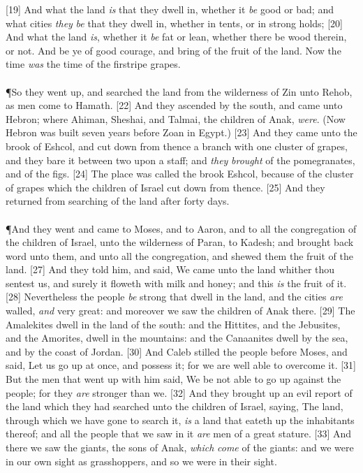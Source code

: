 [19] \textcolor[cmyk]{0.99998,1,0,0}{And what the land \emph{is} that they dwell in, whether it \emph{be} good or bad; and what cities \emph{they} \emph{be} that they dwell in, whether in tents, or in strong holds;}
[20] \textcolor[cmyk]{0.99998,1,0,0}{And what the land \emph{is}, whether it \emph{be} fat or lean, whether there be wood therein, or not. And be ye of good courage, and bring of the fruit of the land. Now the time \emph{was} the time of the firstripe grapes.}\\
\\
\P \textcolor[cmyk]{0.99998,1,0,0}{So they went up, and searched the land from the wilderness of Zin unto Rehob, as men come to Hamath.}
[22] \textcolor[cmyk]{0.99998,1,0,0}{And they ascended by the south, and came unto Hebron; where Ahiman, Sheshai, and Talmai, the children of Anak, \emph{were}. (Now Hebron was built seven years before Zoan in Egypt.)}
[23] \textcolor[cmyk]{0.99998,1,0,0}{And they came unto the brook of Eshcol, and cut down from thence a branch with one cluster of grapes, and they bare it between two upon a staff; and \emph{they} \emph{brought} of the pomegranates, and of the figs.}
[24] \textcolor[cmyk]{0.99998,1,0,0}{The place was called the brook Eshcol, because of the cluster of grapes which the children of Israel cut down from thence.}
[25] \textcolor[cmyk]{0.99998,1,0,0}{And they returned from searching of the land after forty days.}\\
\\
\P \textcolor[cmyk]{0.99998,1,0,0}{And they went and came to Moses, and to Aaron, and to all the congregation of the children of Israel, unto the wilderness of Paran, to Kadesh; and brought back word unto them, and unto all the congregation, and shewed them the fruit of the land.}
[27] \textcolor[cmyk]{0.99998,1,0,0}{And they told him, and said, We came unto the land whither thou sentest us, and surely it floweth with milk and honey; and this \emph{is} the fruit of it.}
[28] \textcolor[cmyk]{0.99998,1,0,0}{Nevertheless the people \emph{be} strong that dwell in the land, and the cities \emph{are} walled, \emph{and} very great: and moreover we saw the children of Anak there.}
[29] \textcolor[cmyk]{0.99998,1,0,0}{The Amalekites dwell in the land of the south: and the Hittites, and the Jebusites, and the Amorites, dwell in the mountains: and the Canaanites dwell by the sea, and by the coast of Jordan.}
[30] \textcolor[cmyk]{0.99998,1,0,0}{And Caleb stilled the people before Moses, and said, Let us go up at once, and possess it; for we are well able to overcome it.}
[31] \textcolor[cmyk]{0.99998,1,0,0}{But the men that went up with him said, We be not able to go up against the people; for they \emph{are} stronger than we.}
[32] \textcolor[cmyk]{0.99998,1,0,0}{And they brought up an evil report of the land which they had searched unto the children of Israel, saying, The land, through which we have gone to search it, \emph{is} a land that eateth up the inhabitants thereof; and all the people that we saw in it \emph{are} men of a great stature.}
[33] \textcolor[cmyk]{0.99998,1,0,0}{And there we saw the giants, the sons of Anak, \emph{which} \emph{come} of the giants: and we were in our own sight as grasshoppers, and so we were in their sight.}

